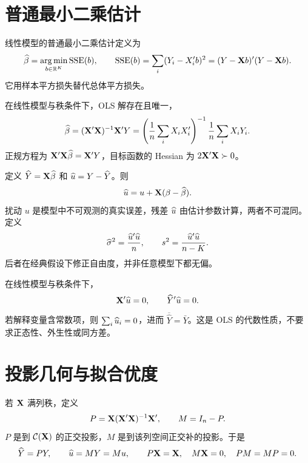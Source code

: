 \section{普通最小二乘估计}

\begin{definition}[OLS]\label{reg:entry:38}
线性模型的普通最小二乘估计定义为
\[\widehat{\beta}=\operatorname*{arg\,min}_{b\in\mathbb{R}^K}\operatorname{SSE}(b),\qquad \operatorname{SSE}(b)=\sum_i(Y_i-X_i'b)^2=(Y-\mathbf{X} b)'(Y-\mathbf{X} b).\]
它用样本平方损失替代总体平方损失。
\end{definition}

\begin{theorem}\label{reg:entry:39}
在线性模型与秩条件下，OLS 解存在且唯一，
\[\widehat{\beta}=(\mathbf{X}'\mathbf{X})^{-1}\mathbf{X}'Y
=\left(\frac1n\sum_iX_iX_i'\right)^{-1}\frac1n\sum_iX_iY_i.\]
正规方程为 $\mathbf{X}'\mathbf{X}\widehat{\beta}=\mathbf{X}'Y$，目标函数的 Hessian 为 $2\mathbf{X}'\mathbf{X}\succ0$。
\end{theorem}

\begin{definition}\label{reg:entry:40}
定义 $\widehat Y=\mathbf{X}\widehat{\beta}$ 和 $\widehat{u}=Y-\widehat Y$。则
\[\widehat{u}=u+\mathbf{X}(\beta-\widehat{\beta}).\]
扰动 $u$ 是模型中不可观测的真实误差，残差 $\widehat{u}$ 由估计参数计算，两者不可混同。定义
\[\widehat\sigma^2=\frac{\widehat{u}'\widehat{u}}{n},\qquad s^2=\frac{\widehat{u}'\widehat{u}}{n-K}.\]
后者在经典假设下修正自由度，并非任意模型下都无偏。
\end{definition}

\begin{theorem}[残差的样本正交性]\label{reg:entry:41}
在线性模型与秩条件下，
\[\mathbf{X}'\widehat{u}=0,\qquad \widehat Y'\widehat{u}=0.\]
若解释变量含常数项，则 $\sum_i\widehat{u}_i=0$，进而 $\overline{\widehat Y}=\bar Y$。这是 OLS 的代数性质，不要求正态性、外生性或同方差。
\end{theorem}

\section{投影几何与拟合优度}

\begin{definition}[投影矩阵与消灭矩阵]\label{reg:entry:42}
若 $\mathbf{X}$ 满列秩，定义
\[P=\mathbf{X}(\mathbf{X}'\mathbf{X})^{-1}\mathbf{X}',\qquad M=I_n-P.\]
$P$ 是到 $\mathcal C(\mathbf{X})$ 的正交投影，$M$ 是到该列空间正交补的投影。于是
\[\widehat Y=PY,\qquad \widehat{u}=MY=Mu,\qquad P\mathbf{X}=\mathbf{X},\quad M\mathbf{X}=0,\quad PM=MP=0.\]
\end{definition}

